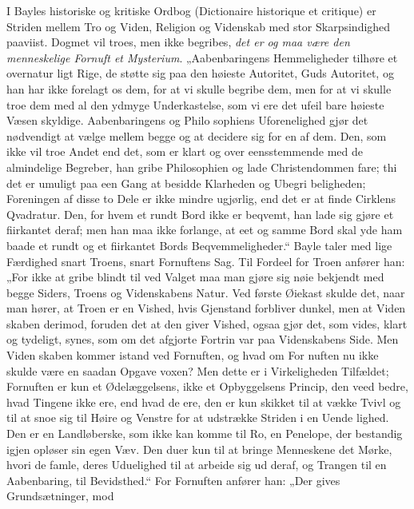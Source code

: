 \documentclass[12pt]{book}
\newcommand{\opage}[1]{\marginnote{\footnotesize\textit{[#1]}}}
\begin{document}
I Bayles historiske og kritiske Ordbog (Dictionaire
historique et critique) er Striden mellem Tro og Viden,
Religion og Videnskab med stor Skarpsindighed paaviist.
Dogmet vil troes, men ikke begribes, \emph{det er og maa
være den menneskelige Fornuft et Mysterium}.
„Aabenbaringens Hemmeligheder tilhøre et overnatur\-%
ligt Rige, de støtte sig paa den høieste Autoritet,
\opage{268}\setcounter{footnote}{0}%
Guds Autoritet, og han har ikke forelagt os dem, for at
vi skulle begribe dem, men for at vi skulle troe dem
med al den ydmyge Underkastelse, som vi ere det ufeil\-%
bare høieste Væsen skyldige. Aabenbaringens og Philo\-%
sophiens Uforenelighed gjør det nødvendigt at vælge
mellem begge og at decidere sig for en af dem. Den,
som ikke vil troe Andet end det, som er klart og over\-%
eensstemmende med de almindelige Begreber, han gribe
Philosophien og lade Christendommen fare; thi det er
umuligt paa een Gang at besidde Klarheden og Ubegri\-%
beligheden; Foreningen af disse to Dele er ikke mindre
ugjørlig, end det er at finde Cirklens Qvadratur. Den,
for hvem et rundt Bord ikke er beqvemt, han lade sig
gjøre et fiirkantet deraf; men han maa ikke forlange, at
eet og samme Bord skal yde ham baade et rundt og et
fiirkantet Bords Beqvemmeligheder.“ Bayle taler med
lige Færdighed snart Troens, snart Fornuftens Sag. Til
Fordeel for Troen anfører han: „For ikke at gribe blindt
til ved Valget maa man gjøre sig nøie bekjendt med
begge Siders, Troens og Videnskabens Natur. Ved første
Øiekast skulde det, naar man hører, at Troen er en
Vished, hvis Gjenstand forbliver dunkel, men at Viden\-%
skaben derimod, foruden det at den giver Vished, ogsaa
gjør det, som vides, klart og tydeligt, synes, som om det
afgjorte Fortrin var paa Videnskabens Side. Men Viden\-%
skaben kommer istand ved Fornuften, og hvad om For\-%
nuften nu ikke skulde være en saadan Opgave voxen?
Men dette er i Virkeligheden Tilfældet; Fornuften er
kun et Ødelæggelsens, ikke et Opbyggelsens Princip, den
veed bedre, hvad Tingene ikke ere, end hvad de ere, den
er kun skikket til at vække Tvivl og til at snoe sig til
Høire og Venstre for at udstrække Striden i en Uende\-%
lighed. Den er en Landløberske, som ikke kan komme
til Ro, en Penelope, der bestandig igjen opløser sin egen
\opage{269}\setcounter{footnote}{0}%
Væv. Den duer kun til at bringe Menneskene det Mørke,
hvori de famle, deres Uduelighed til at arbeide sig ud
deraf, og Trangen til en Aabenbaring, til Bevidsthed.“
For Fornuften anfører han: „Der gives Grundsætninger, mod
\end{document}
